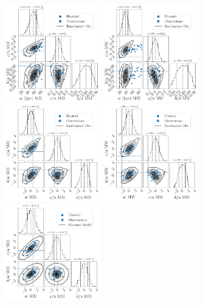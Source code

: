 \documentclass[a4paper,fleqn,usenatbib]{mnras}
\begin{document}
\begin{figure}
\centering
\includegraphics[width=0.37\textwidth]{input_illustris1_obs_M31_n_11.pdf}
\includegraphics[width=0.37\textwidth]{input_illustris1_obs_MW_n_11.pdf}
\includegraphics[width=0.37\textwidth]{input_illustris1_obs_M31_n_11_normed.pdf}
\includegraphics[width=0.37\textwidth]{input_illustris1_obs_MW_n_11_normed.pdf}
\includegraphics[width=0.37\textwidth]{gaussian_model_illustris1_M31_n_11.pdf}

\end{figure}
\end{document}

